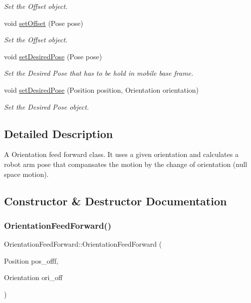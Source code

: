 \begin{DoxyCompactItemize}
\begin{DoxyCompactList}\small\item\em Set the Offset object. \end{DoxyCompactList}\item 
void \hyperlink{classOrientationFeedForward_adbd1691b1e930752818624d065acbf1c}{set\+Offset} (Pose pose)
\begin{DoxyCompactList}\small\item\em Set the Offset object. \end{DoxyCompactList}\item 
void \hyperlink{classOrientationFeedForward_a5f69dfd449972707d2ccd07e20fd2c5b}{set\+Desired\+Pose} (Pose pose)
\begin{DoxyCompactList}\small\item\em Set the Desired Pose that has to be hold in mobile base frame. \end{DoxyCompactList}\item 
void \hyperlink{classOrientationFeedForward_ad419aebf0df88282ca6c1dc24adbadb2}{set\+Desired\+Pose} (Position position, Orientation orientation)
\begin{DoxyCompactList}\small\item\em Set the Desired Pose object. \end{DoxyCompactList}\end{DoxyCompactItemize}


\subsection{Detailed Description}
A Orientation feed forward class. It uses a given orientation and calculates a robot arm pose that compansates the motion by the change of orientation (null space motion). 

\subsection{Constructor \& Destructor Documentation}
\mbox{\label{classOrientationFeedForward_a0ae1aba3b3e0abf84828a9db008b6f69}} 
\subsubsection{\texorpdfstring{Orientation\+Feed\+Forward()}{OrientationFeedForward()}}
{\footnotesize\ttfamily Orientation\+Feed\+Forward\+::\+Orientation\+Feed\+Forward (\begin{DoxyParamCaption}\item[{Position}]{pos\+\_\+offf,  }\item[{Orientation}]{ori\+\_\+off }\end{DoxyParamCaption})}



